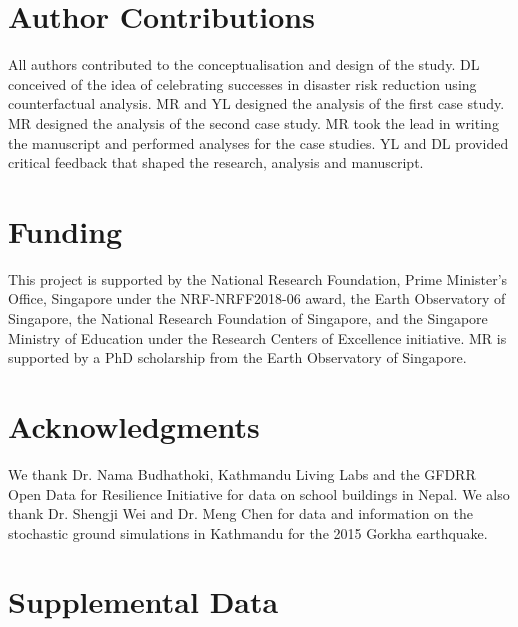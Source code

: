 \documentclass[utf8]{frontiersSCNS} %
\begin{document}
\section*{Author Contributions}

All authors contributed to the conceptualisation and design of the study. DL conceived of the idea of celebrating successes in disaster risk reduction using counterfactual analysis. MR and YL designed the analysis of the first case study. MR designed the analysis of the second case study. MR took the lead in writing the manuscript and performed analyses for the case studies. YL and DL provided critical feedback that shaped the research, analysis and manuscript.


\section*{Funding}
This project is supported by the National Research Foundation, Prime Minister’s Office, Singapore under the NRF-NRFF2018-06 award, the Earth Observatory of Singapore, the National Research Foundation of Singapore, and the Singapore Ministry of Education under the Research Centers of Excellence initiative. MR is supported by a PhD scholarship from the Earth Observatory of Singapore.

\section*{Acknowledgments}
We thank Dr. Nama Budhathoki, Kathmandu Living Labs and the GFDRR Open Data for Resilience Initiative for data on school buildings in Nepal. We also thank Dr. Shengji Wei and Dr. Meng Chen for data and information on the stochastic ground simulations in Kathmandu for the 2015 Gorkha earthquake.

\section*{Supplemental Data}
\end{document}
